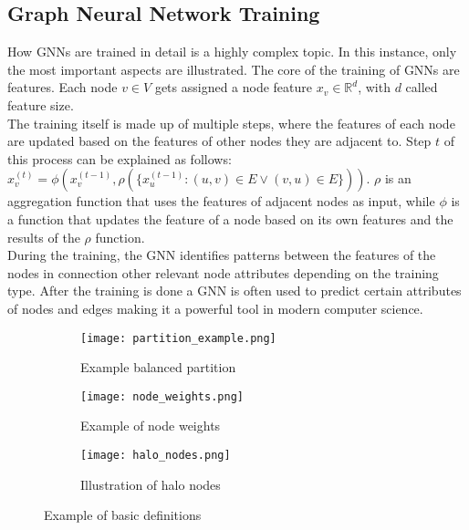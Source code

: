 \documentclass[acmsmall,nonacm,screen,review]{acmart}
\begin{document}
\subsection{Graph Neural Network Training}
How GNNs are trained in detail is a highly complex topic. In this instance, only the most important aspects are illustrated. The core of the training of GNNs are features. Each node $v \in V$ gets assigned a node feature $x_{v} \in \mathbb{R}^{d}$, with $d$ called feature size. \\
The training itself is made up of multiple steps, where the features of each node are updated based on the features of other nodes they are adjacent to. Step $t$ of this process can be explained as follows: $x_{v}^{(t)} = \phi(x_{v}^{(t-1)},\rho(\{x_{u}^{(t-1)} : (u,v) \in E \vee (v,u)\in E\}))$. $\rho$ is an aggregation function that uses the features of adjacent nodes as input, while $\phi$ is a function that updates the feature of a node based on its own features and the results of the $\rho$ function.\\ 
During the training, the GNN identifies patterns between the features of the nodes in connection other relevant node attributes depending on the training type. After the training is done a GNN is often used to predict certain attributes of nodes and edges making it a powerful tool in modern computer science.
\begin{figure}[bt!]
     \centering
     \begin{subfigure}[b]{0.3\textwidth}
         \centering
         \texttt{[image: partition\_example.png]}
         \caption{Example balanced partition}
         \label{partition}
     \end{subfigure}
     \hfill
     \begin{subfigure}[b]{0.3\textwidth}
         \centering
         \texttt{[image: node\_weights.png]}
         \caption{Example of node weights}
         \label{weights}
     \end{subfigure}
     \begin{subfigure}[b]{0.3\textwidth}
        \centering
        \texttt{[image: halo\_nodes.png]}
        \caption{Illustration of halo nodes}
        \label{halo}
     \end{subfigure}
     \caption{Example of basic definitions}
     \label{definitions}
\end{figure}
\end{document}
